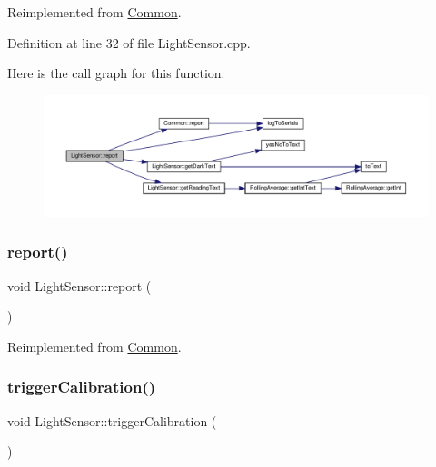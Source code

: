 Reimplemented from \hyperlink{class_common_a9e60e2c26a5f4d72342a59a969954636}{Common}.



Definition at line 32 of file Light\+Sensor.\+cpp.

Here is the call graph for this function\+:
\nopagebreak
\begin{figure}[H]
\begin{center}
\leavevmode
\includegraphics[width=350pt]{class_light_sensor_a08ffec2f2bbb09966a8e37bf1f9887f9_cgraph}
\end{center}
\end{figure}
\mbox{\label{class_light_sensor_a08ffec2f2bbb09966a8e37bf1f9887f9}} 
\subsubsection{\texorpdfstring{report()}{report()}\hspace{0.1cm}{\footnotesize\ttfamily [2/2]}}
{\footnotesize\ttfamily void Light\+Sensor\+::report (\begin{DoxyParamCaption}{ }\end{DoxyParamCaption})\hspace{0.3cm}{\ttfamily [virtual]}}



Reimplemented from \hyperlink{class_common_a9e60e2c26a5f4d72342a59a969954636}{Common}.

\mbox{\label{class_light_sensor_a50559883ebb2c80a5d2144a6453bd1c3}} 
\subsubsection{\texorpdfstring{trigger\+Calibration()}{triggerCalibration()}\hspace{0.1cm}{\footnotesize\ttfamily [1/2]}}
{\footnotesize\ttfamily void Light\+Sensor\+::trigger\+Calibration (\begin{DoxyParamCaption}{ }\end{DoxyParamCaption})}

